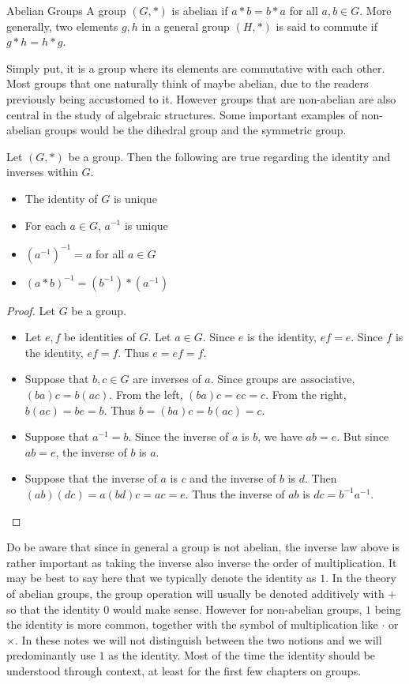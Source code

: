 \documentclass[a4paper]{article}
\begin{document}
\begin{defn}{Abelian Groups}{} A group $(G,\ast)$ is abelian if $a\ast b=b\ast a$ for all $a,b\in G$. More generally, two elements $g,h$ in a general group $(H,\ast)$ is said to commute if $g\ast h=h\ast g$. 
\end{defn}

Simply put, it is a group where its elements are commutative with each other. Most groups that one naturally think of maybe abelian, due to the readers previously being accustomed to it. However groups that are non-abelian are also central in the study of algebraic structures. Some important examples of non-abelian groups would be the dihedral group and the symmetric group. 

\begin{prp}{}{} Let $(G,\ast)$ be a group. Then the following are true regarding the identity and inverses within $G$. 
\begin{itemize}
\item The identity of $G$ is unique
\item For each $a\in G$, $a^{-1}$ is unique
\item $(a^{-1})^{-1}=a$ for all $a\in G$
\item $(a\ast b)^{-1}=(b^{-1})\ast(a^{-1})$
\end{itemize}\tcbline
\begin{proof} Let $G$ be a group. 
\begin{itemize}
\item Let $e,f$ be identities of $G$. Let $a\in G$. Since $e$ is the identity, $ef=e$. Since $f$ is the identity, $ef=f$. Thus $e=ef=f$. 
\item Suppose that $b,c\in G$ are inverses of $a$. Since groups are associative, $(ba)c=b(ac)$. From the left, $(ba)c=ec=c$. From the right, $b(ac)=be=b$. Thus $b=(ba)c=b(ac)=c$. 
\item Suppose that $a^{-1}=b$. Since the inverse of $a$ is $b$, we have $ab=e$. But since $ab=e$, the inverse of $b$ is $a$. 
\item Suppose that the inverse of $a$ is $c$ and the inverse of $b$ is $d$. Then $(ab)(dc)=a(bd)c=ac=e$. Thus the inverse of $ab$ is $dc=b^{-1}a^{-1}$. 
\end{itemize}
\end{proof}
\end{prp}

Do be aware that since in general a group is not abelian, the inverse law above is rather important as taking the inverse also inverse the order of multiplication. It may be best to say here that we typically denote the identity as $1$. In the theory of abelian groups, the group operation will usually be denoted additively with $+$ so that the identity $0$ would make sense. However for non-abelian groups, $1$ being the identity is more common, together with the symbol of multiplication like $\cdot$ or $\times$. In these notes we will not distinguish between the two notions and we will predominantly use $1$ as the identity. Most of the time the identity should be understood through context, at least for the first few chapters on groups. \\~\\
\end{document}
